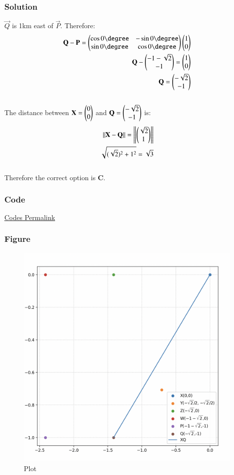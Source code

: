 \documentclass{beamer}
\begin{document}
\begin{frame}[fragile]
    \frametitle{Solution}
$\vec{Q}$ is 1km east of $\vec{P}$. Therefore:\begin{align}
\vec{Q}-\vec{P} = \myvec{\cos0\degree & -\sin0\degree \\ \sin0\degree & \cos0\degree}\myvec{1\\0}\\
\vec{Q}-\myvec{-1-\sqrt{2}\\-1} = \myvec{1\\0}\\
\vec{Q}=\myvec{-\sqrt{2}\\-1}
\end{align}\\
The distance between $\mathbf{X}=\begin{pmatrix}0\\0\end{pmatrix}$ and $\mathbf{Q}=\begin{pmatrix}-\sqrt{2}\\-1\end{pmatrix}$ is:
\begin{align}
    ||\mathbf{X} - \mathbf{Q}||= \left\lVert\begin{pmatrix}\sqrt{2}\\1\end{pmatrix}\right\rVert \\
    \sqrt{(\sqrt{2})^2 +1^2} = \sqrt{3}
\end{align}\\
Therefore the correct option is \textbf{C}.
\end{frame}

\begin{frame}[fragile]
    \frametitle{Code}
\href{https://github.com/AdityaAppana/ee1030-2025/tree/96431e23cc4d088e70368e400c3c60fbecfcaaa8/ee25btech11004/matgeo/12.18/Codes}{Codes Permalink}
\end{frame}

\begin{frame}[fragile]
    \frametitle{Figure}
\begin{figure}[H]
    \centering
    \includegraphics[width=0.6\columnwidth]{Figs/1218.png}
    \caption{Plot}
    \label{fig:placeholder}
\end{figure}
\end{frame}
\end{document}
